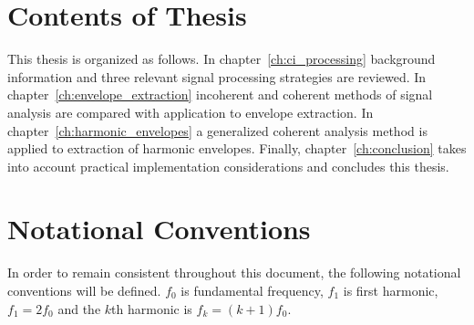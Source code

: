 \documentclass [11pt, proquest,oneside] {ganter_thesis}[2015/03/03]
\begin{document}


\section{Contents of Thesis}

This thesis is organized as follows.  In chapter~\ref{ch:ci_processing} background information and three relevant signal processing strategies are reviewed.  In chapter~\ref{ch:envelope_extraction} incoherent and coherent methods of signal analysis are compared with application to envelope extraction.  In chapter~\ref{ch:harmonic_envelopes} a generalized coherent analysis method is applied to extraction of harmonic envelopes.  Finally, chapter~\ref{ch:conclusion} takes into account practical implementation considerations and concludes this thesis.

\section{Notational Conventions}

In order to remain consistent throughout this document, the following notational conventions will be defined.  $f_0$ is fundamental frequency, $f_1$ is first harmonic, $f_1 = 2f_0$ and the $k$th harmonic is $f_k = (k+1)f_0$.
\end{document}
